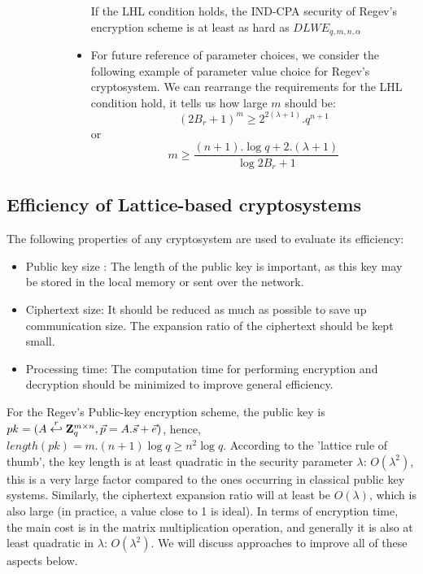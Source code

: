 \begin{description}
\begin{description}
\begin{itemize}
      \begin{theorem}
        If the LHL condition holds, the IND-CPA security of Regev's encryption scheme is
        at least as hard as $DLWE_{q,m,n,\alpha}$
        \label{theo:IndCPARegev}
      \end{theorem}
    \item For future reference of parameter choices, we consider the following example of
      parameter value choice for Regev's cryptosystem. We can rearrange the
      requirements for the LHL condition hold, it tells us how large $m$ should
      be:
      \[
        (2B_r + 1 )^m \geq 2^{2(\lambda + 1)}.q^{n+1}
      \]
      or
      \[
        m \geq \frac{(n+1).\log q + 2.(\lambda+1)}{\log{2B_r + 1}}
      \]

    \end{itemize}

  \end{description}

\end{description}

\subsection{Efficiency of Lattice-based cryptosystems}
\label{sec:latticeEfficiency}

The following properties of any cryptosystem are used to evaluate its efficiency:
\begin{itemize}
\item Public key size : The length of the public key is important, as this key may be stored in the local memory or sent over the network.
\item Ciphertext size: It should be reduced as much as possible to save up communication size. The
  expansion ratio of the ciphertext should be kept small.
\item Processing time: The computation time for performing encryption and decryption should be minimized to improve general efficiency.
\end{itemize}
For the Regev's Public-key encryption scheme, the public key is
$pk=(A \stackrel{r}{\hookleftarrow} \mathbf{Z}_q^{m \times n}, \vec{p} = A.\vec{s} + \vec{e})$,
hence, $length(pk) = m.(n+1)\log q \geq n^2\log q$. According to the 'lattice
rule of thumb', the key length is at least quadratic in the
security parameter $\lambda$: $O(\lambda^2)$, this is a very large factor
compared to the ones occurring in classical public key systems.  Similarly, the
ciphertext expansion ratio will at least be $O(\lambda)$, which is also large (in
practice, a value close to 1 is ideal). In terms of encryption time,
the main cost is in the matrix multiplication operation, and generally it is
also at least quadratic in $\lambda$: $O(\lambda^2)$. We will discuss approaches
to improve all of these aspects below.

